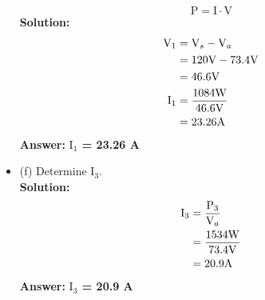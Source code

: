 \documentclass{article}
\begin{document}
\begin{itemize}
\begin{equation}
		\end{equation}
		\begin{equation}
			\text{P} = \text{I} \cdot \text{V}
		\end{equation}
		\textbf{Solution:}
		\begin{align*}
				\text{V}_1 &= \text{V}_s - \text{V}_a \\
				&= 120 \text{V} - 73.4 \text{V} \\
				&= 46.6 \text{V} \\
				\text{I}_1 &= {1084 \text{W} \over 46.6 \text{V}} \\
				&= 23.26 \text{A}
		\end{align*}
		\textbf{Answer:} \textbf{$\text{I}_1$ = 23.26 A}
	\item (f) Determine $\text{I}_3$. \\
		\textbf{Solution:}
		\begin{align*}
			\text{I}_3 &= { \text{P}_3 \over \text{V}_a } \\
			&= { 1534 \text{W} \over 73.4 \text{V} } \\
			&= 20.9 \text{A} \\
		\end{align*}
		\textbf{Answer:} \textbf{$\text{I}_3$ = 20.9 A}
\end{itemize}

\newpage
\end{document}
